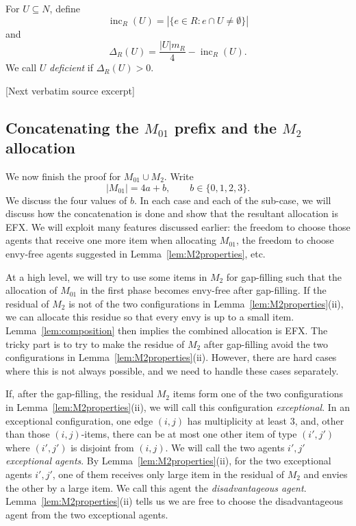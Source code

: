 \documentclass[10pt]{article}
\begin{document}
\begin{ReviewVerbatim}
For $U\subseteq N$, define
\[
 \operatorname{inc}_R(U)=\left|\{e\in R:e\cap U\neq\emptyset\}\right|
\]
and
\[
 \Delta_R(U)=\frac{|U|m_R}{4}-\operatorname{inc}_R(U).
\]
We call $U$ \emph{deficient} if $\Delta_R(U)>0$.

[Next verbatim source excerpt]

\subsection{Concatenating the $M_{01}$ prefix and the $M_2$ allocation}
\label{subsec:combine}
We now finish the proof for $M_{01}\cup M_2$.  Write
\[
 |M_{01}|=4a+b,
 \qquad b\in\{0,1,2,3\}.
\]
We discuss the four values of $b$.
In each case and each of the sub-case, we will discuss how the concatenation is done and show that the resultant allocation is EFX.
We will exploit many features discussed earlier: the freedom to choose those agents that receive one more item when allocating $M_{01}$, the freedom to choose envy-free agents suggested in Lemma~\ref{lem:M2properties}, etc.

At a high level, we will try to use some items in $M_2$ for gap-filling such that the allocation of $M_{01}$ in the first phase becomes envy-free after gap-filling.
If the residual of $M_2$ is not of the two configurations in Lemma~\ref{lem:M2properties}(ii), we can allocate this residue so that every envy is up to a small item.
Lemma~\ref{lem:composition} then implies the combined allocation is EFX.
The tricky part is to try to make the residue of $M_2$ after gap-filling avoid the two configurations in Lemma~\ref{lem:M2properties}(ii).
However, there are hard cases where this is not always possible, and we need to handle these cases separately.

If, after the gap-filling, the residual $M_2$ items form one of the two configurations in Lemma~\ref{lem:M2properties}(ii), we will call this configuration \emph{exceptional}.
In an exceptional configuration, one edge $(i,j)$ has multiplicity at least $3$, and, other than those $(i,j)$-items, there can be at most one other item of type $(i',j')$ where $(i',j')$ is disjoint from $(i,j)$.
We will call the two agents $i',j'$ \emph{exceptional agents}.
By Lemma~\ref{lem:M2properties}(ii), for the two exceptional agents $i',j'$, one of them receives only large item in the residual of $M_2$ and envies the other by a large item.
We call this agent the \emph{disadvantageous agent}.
Lemma~\ref{lem:M2properties}(ii) tells us we are free to choose the disadvantageous agent from the two exceptional agents.
\end{ReviewVerbatim}
\end{document}
